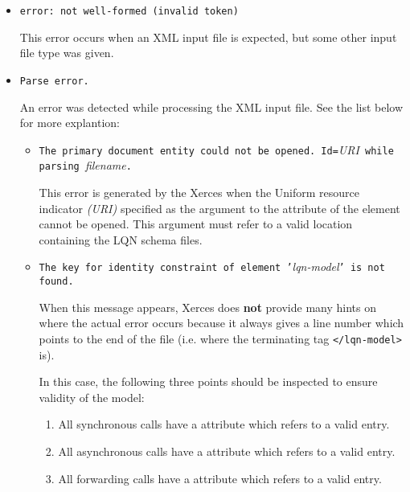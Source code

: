 \begin{itemize}
\item \texttt{error: not well-formed (invalid token)}

  This error occurs when an XML input file is expected, but some other
  input file type was given.

\item \texttt{Parse error.}

  An error was detected while processing the XML input file\indexerror{}.  See the list below for more
  explantion:

\begin{itemize}
\item \texttt{The primary document entity could not be opened. Id=}\emph{URI}\texttt{ while parsing
  }\emph{filename}\texttt{.}
  
  This error\label{error:primary-document} is generated by the
  Xerces when the Uniform resource indicator \emph{(URI)} specified as the argument to
  the  attribute of the  element cannot be
  opened.  This argument must refer to a valid location containing the LQN schema files.
\item \texttt{The key for identity constraint of element '}\emph{lqn-model}\texttt{' is not found.}
  
  When this message appears, Xerces does \textbf{not} provide many hints on where the actual
  error occurs because it always gives a line number which points to the end of the file (i.e. where the
  terminating tag \verb!</lqn-model>! is).

  In this case, the following three points should be inspected to
  ensure validity of the model:

  \begin{enumerate}
  \item All synchronous calls have a  attribute which
    refers to a valid entry.
  \item All asynchronous calls have a  attribute which
    refers to a valid entry.
  \item All forwarding calls have a  attribute which
    refers to a valid entry.
  \end{enumerate}


\end{itemize}
\end{itemize}
